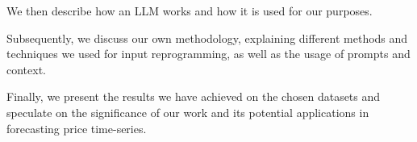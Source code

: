
We then describe how an LLM works and how it is used for our purposes.

Subsequently, we discuss our own methodology, explaining different methods and techniques we used for input reprogramming, as well as the usage of prompts and context.

Finally, we present the results we have achieved on the chosen datasets and speculate on the significance of our work and its potential applications in forecasting price time-series.
